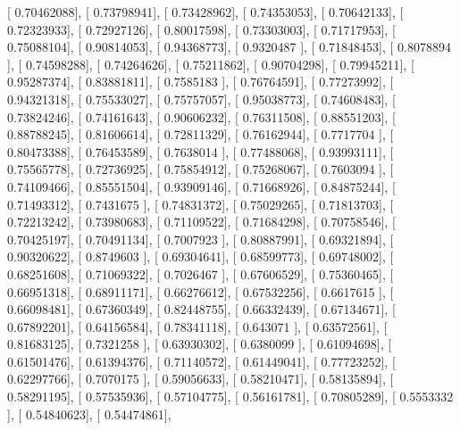 \documentclass{article}
\begin{document}
       [ 0.70462088],
       [ 0.73798941],
       [ 0.73428962],
       [ 0.74353053],
       [ 0.70642133],
       [ 0.72323933],
       [ 0.72927126],
       [ 0.80017598],
       [ 0.73303003],
       [ 0.71717953],
       [ 0.75088104],
       [ 0.90814053],
       [ 0.94368773],
       [ 0.9320487 ],
       [ 0.71848453],
       [ 0.8078894 ],
       [ 0.74598288],
       [ 0.74264626],
       [ 0.75211862],
       [ 0.90704298],
       [ 0.79945211],
       [ 0.95287374],
       [ 0.83881811],
       [ 0.7585183 ],
       [ 0.76764591],
       [ 0.77273992],
       [ 0.94321318],
       [ 0.75533027],
       [ 0.75757057],
       [ 0.95038773],
       [ 0.74608483],
       [ 0.73824246],
       [ 0.74161643],
       [ 0.90606232],
       [ 0.76311508],
       [ 0.88551203],
       [ 0.88788245],
       [ 0.81606614],
       [ 0.72811329],
       [ 0.76162944],
       [ 0.7717704 ],
       [ 0.80473388],
       [ 0.76453589],
       [ 0.7638014 ],
       [ 0.77488068],
       [ 0.93993111],
       [ 0.75565778],
       [ 0.72736925],
       [ 0.75854912],
       [ 0.75268067],
       [ 0.7603094 ],
       [ 0.74109466],
       [ 0.85551504],
       [ 0.93909146],
       [ 0.71668926],
       [ 0.84875244],
       [ 0.71493312],
       [ 0.7431675 ],
       [ 0.74831372],
       [ 0.75029265],
       [ 0.71813703],
       [ 0.72213242],
       [ 0.73980683],
       [ 0.71109522],
       [ 0.71684298],
       [ 0.70758546],
       [ 0.70425197],
       [ 0.70491134],
       [ 0.7007923 ],
       [ 0.80887991],
       [ 0.69321894],
       [ 0.90320622],
       [ 0.8749603 ],
       [ 0.69304641],
       [ 0.68599773],
       [ 0.69748002],
       [ 0.68251608],
       [ 0.71069322],
       [ 0.7026467 ],
       [ 0.67606529],
       [ 0.75360465],
       [ 0.66951318],
       [ 0.68911171],
       [ 0.66276612],
       [ 0.67532256],
       [ 0.6617615 ],
       [ 0.66098481],
       [ 0.67360349],
       [ 0.82448755],
       [ 0.66332439],
       [ 0.67134671],
       [ 0.67892201],
       [ 0.64156584],
       [ 0.78341118],
       [ 0.643071  ],
       [ 0.63572561],
       [ 0.81683125],
       [ 0.7321258 ],
       [ 0.63930302],
       [ 0.6380099 ],
       [ 0.61094698],
       [ 0.61501476],
       [ 0.61394376],
       [ 0.71140572],
       [ 0.61449041],
       [ 0.77723252],
       [ 0.62297766],
       [ 0.7070175 ],
       [ 0.59056633],
       [ 0.58210471],
       [ 0.58135894],
       [ 0.58291195],
       [ 0.57535936],
       [ 0.57104775],
       [ 0.56161781],
       [ 0.70805289],
       [ 0.5553332 ],
       [ 0.54840623],
       [ 0.54474861],
\end{document}
